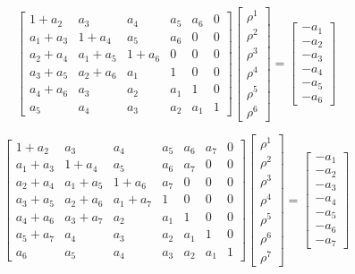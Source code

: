 \documentclass[12pt,letterpaper]{article}
\begin{document}
\[
\begin{bmatrix}
 1+a_2 & a_3 & a_4 & a_5 & a_6 & 0 \\
 a_1+a_3 & 1+a_4 & a_5 & a_6 & 0 & 0 \\
 a_2+a_4 & a_1+a_5 & 1+a_6 & 0 & 0 & 0 \\
 a_3+a_5 & a_2+a_6 & a_1 & 1 & 0 & 0 \\
 a_4+a_6 & a_3 & a_2 & a_1 & 1 & 0 \\
 a_5 & a_4 & a_3 & a_2 & a_1 & 1
\end{bmatrix}
\begin{bmatrix}
 \rho^1 \\
 \rho^2 \\
 \rho^3 \\
 \rho^4 \\
 \rho^5 \\
 \rho^6
\end{bmatrix}
=
\begin{bmatrix}
 -a_1 \\
 -a_2 \\
 -a_3 \\
 -a_4 \\
 -a_5 \\
 -a_6
\end{bmatrix}
\]

\[
\begin{bmatrix}
 1+a_2 & a_3 & a_4 & a_5 & a_6 & a_7 & 0 \\
 a_1+a_3 & 1+a_4 & a_5 & a_6 & a_7 & 0 & 0 \\
 a_2+a_4 & a_1+a_5 & 1+a_6 & a_7 & 0 & 0 & 0 \\
 a_3+a_5 & a_2+a_6 & a_1+a_7 & 1 & 0 & 0 & 0 \\
 a_4+a_6 & a_3+a_7 & a_2 & a_1 & 1 & 0 & 0 \\
 a_5+a_7 & a_4 & a_3 & a_2 & a_1 & 1 & 0 \\
 a_6 & a_5 & a_4 & a_3 & a_2 & a_1 & 1
\end{bmatrix}
\begin{bmatrix}
 \rho^1 \\
 \rho^2 \\
 \rho^3 \\
 \rho^4 \\
 \rho^5 \\
 \rho^6 \\
 \rho^7
\end{bmatrix}
=
\begin{bmatrix}
 -a_1 \\
 -a_2 \\
 -a_3 \\
 -a_4 \\
 -a_5 \\
 -a_6 \\
 -a_7
\end{bmatrix}
\]
\end{document}
